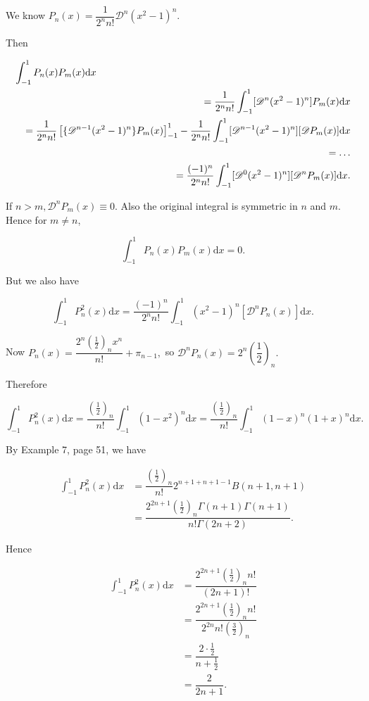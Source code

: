 \begin{solution}
We know $P_n(x) = \dfrac{1}{2^n n!} \mathscr{D}^n (x^2-1)^n.$

Then

\begin{eqnarray*}
\lefteqn{\displaystyle\int_{-1}^1 P_n(x) P_m(x) \mathrm{d}x} \\
& &= \dfrac{1}{2^n n!} \displaystyle\int_{-1}^1 [\mathscr{D}^n (x^2-1)^n] P_m(x) \mathrm{d}x \\
&&= \dfrac{1}{2^n n!} \left[\{\mathscr{D}^{n-1}(x^2-1)^n \} P_m(x) \right]_{-1}^1 - \dfrac{1}{2^n n!} \displaystyle\int_{-1}^1 [\mathscr{D}^{n-1}(x^2-1)^n] [\mathscr{D}P_m(x)] \mathrm{d}x \\
&&= \ldots \\
&&= \dfrac{(-1)^n}{2^n n!} \displaystyle\int_{-1}^1 [\mathscr{D}^0 (x^2-1)^n] [\mathscr{D}^n P_m(x) ] \mathrm{d}x.
\end{eqnarray*}

If $n > m, \mathscr{D}^n P_m(x) \equiv 0.$ Also the original integral is symmetric in $n$ and $m$. Hence for $m \neq n$,

$$\displaystyle\int_{-1}^1 P_n(x) P_m(x) \mathrm{d}x = 0.$$

But we also have

$$\displaystyle\int_{-1}^1 P_n^2(x) \mathrm{d}x = \dfrac{(-1)^n}{2^n n!} \displaystyle\int_{-1}^1 (x^2-1)^n [ \mathscr{D}^n P_n(x) ] \mathrm{d}x.$$

Now $P_n(x) = \dfrac{2^n (\frac{1}{2})_n x^n}{n!} + \pi_{n-1},$ so $\mathscr{D}^n P_n(x) = 2^n \left( \dfrac{1}{2} \right)_n.$

Therefore

$$\displaystyle\int_{-1}^1 P_n^2(x) \mathrm{d}x = \dfrac{(\frac{1}{2})_n}{n!} \displaystyle\int_{-1}^1 (1-x^2)^n \mathrm{d}x = \dfrac{(\frac{1}{2})_n}{n!} \displaystyle\int_{-1}^1 (1-x)^n (1+x)^n \mathrm{d}x.$$

By Example 7, page 51, we have

$$\begin{array}{ll}
\displaystyle\int_{-1}^1 P_n^2(x) \mathrm{d}x &= \dfrac{(\frac{1}{2})_n}{n!} 2^{n+1+n+1-1} B(n+1,n+1) \\
&= \dfrac{2^{2n+1} (\frac{1}{2})_n \Gamma(n+1) \Gamma(n+1)}{n! \Gamma(2n+2)}.
\end{array}$$

Hence

$$\begin{array}{ll}
\displaystyle\int_{-1}^1 P_n^2(x) \mathrm{d}x &= \dfrac{2^{2n+1} (\frac{1}{2})_n n!}{(2n+1)!} \\
&= \dfrac{2^{2n+1} (\frac{1}{2})_n n!}{2^{2n} n! (\frac{3}{2})_n} \\
&= \dfrac{2 \cdot \frac{1}{2}}{n + \frac{1}{2}} \\
&= \dfrac{2}{2n+1}.
\end{array}$$
\end{solution}
